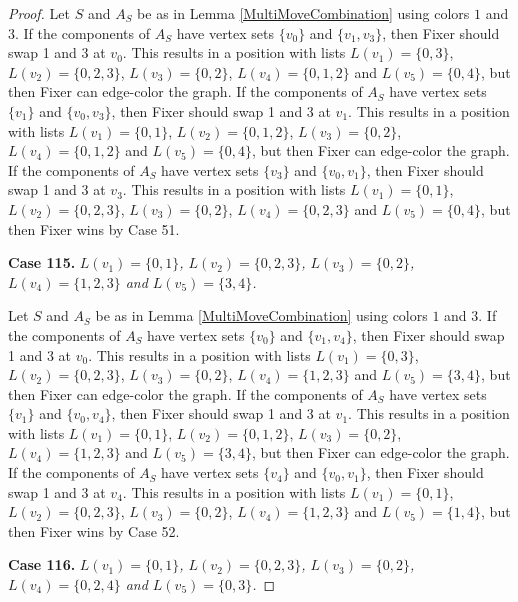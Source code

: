 \documentclass[12pt]{amsart}
\theoremstyle{plain}
\theoremstyle{definition}
\theoremstyle{remark}
\begin{document}
\begin{proof}
Let $S$ and $A_S$ be as in Lemma \ref{MultiMoveCombination} using colors $1$ and $3$. If the components of $A_S$ have vertex sets $\{v_0\}$ and $\{v_1, v_3\}$, then Fixer should swap 1 and 3 at $v_0$. This results in a position with lists $L(v_1) = \{0, 3\}$, $L(v_2) = \{0, 2, 3\}$, $L(v_3) = \{0, 2\}$, $L(v_4) = \{0, 1, 2\}$ and $L(v_5) = \{0, 4\}$, but then Fixer can edge-color the graph.
If the components of $A_S$ have vertex sets $\{v_1\}$ and $\{v_0, v_3\}$, then Fixer should swap 1 and 3 at $v_1$. This results in a position with lists $L(v_1) = \{0, 1\}$, $L(v_2) = \{0, 1, 2\}$, $L(v_3) = \{0, 2\}$, $L(v_4) = \{0, 1, 2\}$ and $L(v_5) = \{0, 4\}$, but then Fixer can edge-color the graph.
If the components of $A_S$ have vertex sets $\{v_3\}$ and $\{v_0, v_1\}$, then Fixer should swap 1 and 3 at $v_3$. This results in a position with lists $L(v_1) = \{0, 1\}$, $L(v_2) = \{0, 2, 3\}$, $L(v_3) = \{0, 2\}$, $L(v_4) = \{0, 2, 3\}$ and $L(v_5) = \{0, 4\}$, but then Fixer wins by Case 51.

\noindent\textbf{Case 115.  }\textit{$L(v_1) = \{0, 1\}$, $L(v_2) = \{0, 2, 3\}$, $L(v_3) = \{0, 2\}$, $L(v_4) = \{1, 2, 3\}$ and $L(v_5) = \{3, 4\}$.}

Let $S$ and $A_S$ be as in Lemma \ref{MultiMoveCombination} using colors $1$ and $3$. If the components of $A_S$ have vertex sets $\{v_0\}$ and $\{v_1, v_4\}$, then Fixer should swap 1 and 3 at $v_0$. This results in a position with lists $L(v_1) = \{0, 3\}$, $L(v_2) = \{0, 2, 3\}$, $L(v_3) = \{0, 2\}$, $L(v_4) = \{1, 2, 3\}$ and $L(v_5) = \{3, 4\}$, but then Fixer can edge-color the graph.
If the components of $A_S$ have vertex sets $\{v_1\}$ and $\{v_0, v_4\}$, then Fixer should swap 1 and 3 at $v_1$. This results in a position with lists $L(v_1) = \{0, 1\}$, $L(v_2) = \{0, 1, 2\}$, $L(v_3) = \{0, 2\}$, $L(v_4) = \{1, 2, 3\}$ and $L(v_5) = \{3, 4\}$, but then Fixer can edge-color the graph.
If the components of $A_S$ have vertex sets $\{v_4\}$ and $\{v_0, v_1\}$, then Fixer should swap 1 and 3 at $v_4$. This results in a position with lists $L(v_1) = \{0, 1\}$, $L(v_2) = \{0, 2, 3\}$, $L(v_3) = \{0, 2\}$, $L(v_4) = \{1, 2, 3\}$ and $L(v_5) = \{1, 4\}$, but then Fixer wins by Case 52.

\noindent\textbf{Case 116.  }\textit{$L(v_1) = \{0, 1\}$, $L(v_2) = \{0, 2, 3\}$, $L(v_3) = \{0, 2\}$, $L(v_4) = \{0, 2, 4\}$ and $L(v_5) = \{0, 3\}$.}


\end{proof}
\end{document}
